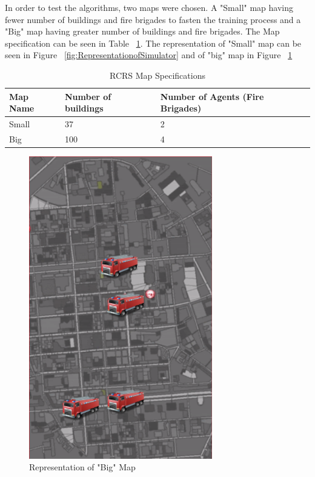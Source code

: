 \documentclass[12pt]{report}
\begin{document}
In order to test the algorithms, two maps were chosen. A "Small" map having fewer number of buildings and fire brigades to fasten the training process and a "Big" map having greater number of buildings and fire brigades. The Map specification can be seen in Table ~\ref{table:RCRSMapSpecs}. The representation of "Small" map can be seen in Figure ~\ref{fig:RepresentationofSimulator} and of "big" map in Figure ~\ref{fig:BigMap}

\begin{table} [!h]
\begin{center}
 \begin{tabular}{l | l | l} 
 \hline
 Map Name & Number of buildings & Number of Agents (Fire Brigades)  \\ [0.5ex] 
 \hline\hline
 Small & 37 & 2\\
 Big & 100 & 4\\
 \hline
\end{tabular}
\caption{RCRS Map Specifications}
\label{table:RCRSMapSpecs}
\end{center}
\end{table}

\begin{figure}[!h]
    \centering
    \includegraphics[width=8cm]{BigMap.png}
    \caption{Representation of "Big" Map}
    \label{fig:BigMap}
\end{figure}
\end{document}
